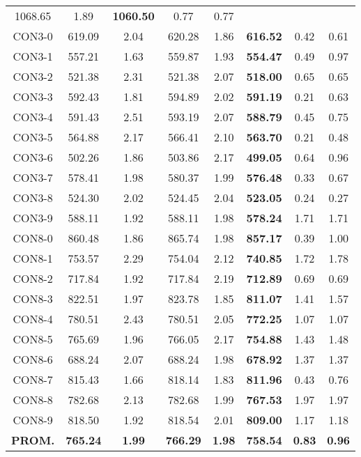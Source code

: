 \begin{table}[ht]
\begin{tabular}{c c c c c c c c}
1068.65 & 1.89 & \bf{1060.50} & 
0.77 & 0.77\\CON3-0 & 619.09 & 2.04 & 
620.28 & 1.86 & \bf{616.52} & 
0.42 & 0.61\\CON3-1 & 557.21 & 1.63 & 
559.87 & 1.93 & \bf{554.47} & 
0.49 & 0.97\\CON3-2 & 521.38 & 2.31 & 
521.38 & 2.07 & \bf{518.00} & 
0.65 & 0.65\\CON3-3 & 592.43 & 1.81 & 
594.89 & 2.02 & \bf{591.19} & 
0.21 & 0.63\\CON3-4 & 591.43 & 2.51 & 
593.19 & 2.07 & \bf{588.79} & 
0.45 & 0.75\\CON3-5 & 564.88 & 2.17 & 
566.41 & 2.10 & \bf{563.70} & 
0.21 & 0.48\\CON3-6 & 502.26 & 1.86 & 
503.86 & 2.17 & \bf{499.05} & 
0.64 & 0.96\\CON3-7 & 578.41 & 1.98 & 
580.37 & 1.99 & \bf{576.48} & 
0.33 & 0.67\\CON3-8 & 524.30 & 2.02 & 
524.45 & 2.04 & \bf{523.05} & 
0.24 & 0.27\\CON3-9 & 588.11 & 1.92 & 
588.11 & 1.98 & \bf{578.24} & 
1.71 & 1.71\\CON8-0 & 860.48 & 1.86 & 
865.74 & 1.98 & \bf{857.17} & 
0.39 & 1.00\\CON8-1 & 753.57 & 2.29 & 
754.04 & 2.12 & \bf{740.85} & 
1.72 & 1.78\\CON8-2 & 717.84 & 1.92 & 
717.84 & 2.19 & \bf{712.89} & 
0.69 & 0.69\\CON8-3 & 822.51 & 1.97 & 
823.78 & 1.85 & \bf{811.07} & 
1.41 & 1.57\\CON8-4 & 780.51 & 2.43 & 
780.51 & 2.05 & \bf{772.25} & 
1.07 & 1.07\\CON8-5 & 765.69 & 1.96 & 
766.05 & 2.17 & \bf{754.88} & 
1.43 & 1.48\\CON8-6 & 688.24 & 2.07 & 
688.24 & 1.98 & \bf{678.92} & 
1.37 & 1.37\\CON8-7 & 815.43 & 1.66 & 
818.14 & 1.83 & \bf{811.96} & 
0.43 & 0.76\\CON8-8 & 782.68 & 2.13 & 
782.68 & 1.99 & \bf{767.53} & 
1.97 & 1.97\\CON8-9 & 818.50 & 1.92 & 
818.54 & 2.01 & \bf{809.00} & 
1.17 & 1.18\\\bf{PROM.} & 
\bf{765.24} & \bf{1.99} & \bf{766.29} & \bf{1.98} & \bf{758.54} & \bf{0.83} & \bf{0.96}\\[1ex]\hline
\end{tabular}
\label{table:nonlin}
\end{table} \clearpage

